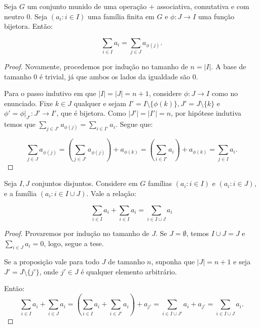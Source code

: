 \begin{prop}\label{prop:group_sumVarChange}
    Seja $G$ um conjunto munido de uma operação $+$ associativa, comutativa e com neutro $0$.
Seja $(a_i: i \in I)$ uma família finita em $G$ e $\phi:J\rightarrow I$ uma função bijetora.
Então:

    \[\sum_{i \in I}a_i=\sum_{j \in J}a_{\phi(j)}.\]

\end{prop}
\begin{proof}
Novamente, procedemos por indução no tamanho de $n=|I|$.
A base de tamanho $0$ é trivial, já que ambos os lados da igualdade são $0$.

Para o passo indutivo em que $|I|=|J|=n+1$, considere $\phi:J\rightarrow I$ como no enunciado.
Fixe $k \in J$ qualquer e sejam $I'=I\setminus\{\phi(k)\}, J'=J\setminus\{k\}$ e $\phi'=\phi|_{J'}:J'\rightarrow I'$, que é bijetora.
Como $|J'|=|I'|=n$, por hipótese indutiva temos que $\sum_{j \in J'}a_{\phi(j)}=\sum_{i \in I'}a_i$.
Segue que:

\[\sum_{j \in J}a_{\phi(j)}=\left(\sum_{j \in J'}a_{\phi(j)}\right)+a_{\phi(k)}=\left(\sum_{i \in I'}a_{i}\right)+a_{\phi(k)}=\sum_{j \in I}a_{i}.\]
\end{proof}
\begin{prop}\label{prop:group_sumConcat}
    Seja $I, J$ conjuntos disjuntos. Considere em $G$ famílias $(a_i: i \in I)$ e $(a_i: i \in J)$, e a família $(a_i: i \in I\cup J)$.
    Vale a relação:

    \[\sum_{i \in I}a_i+\sum_{i \in I}a_i=\sum_{i \in I\cup J}a_i\]
\end{prop}
\begin{proof}
    Provaremos por indução no tamanho de $J$.
    Se $J=\emptyset$, temos $I\cup J=J$ e $\sum_{i \in J}a_i=0$, logo, segue a tese.

    Se a proposição vale para todo $J$ de tamanho $n$, suponha que $|J|=n+1$ e seja $J'=J\setminus \{j'\}$, onde $j' \in J$ é qualquer elemento arbitrário.

    Então:
    \[\sum_{i \in I}a_i+\sum_{i \in J}a_i=\left(\sum_{i \in I}a_i+\sum_{i \in J'}a_i\right)+a_{j'}=\sum_{i \in I\cup J'}a_i+a_{j'}=\sum_{i \in I\cup J}a_i.\]
\end{proof}

